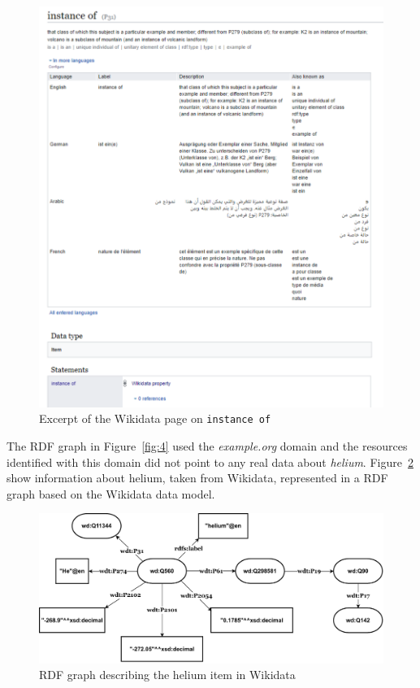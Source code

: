 \begin{figure}[hp]
  \centering
  \includegraphics[width=\linewidth]{images/instance_of.pdf}
  \caption{Excerpt of the Wikidata page on \texttt{instance of}}
  \label{fig:6}
\end{figure}


The RDF graph in Figure~\ref{fig:4} used the \textit{example.org} domain and the resources identified with this domain did not point to any real data about \textit{helium}. Figure~\ref{fig:7} show information about helium, taken from Wikidata, represented in a RDF graph based on the Wikidata data model. 


\begin{figure}[h]
  \centering
  \includegraphics[width=0.75 \linewidth]{images/wikidata_graph.drawio.pdf}
  \caption{RDF graph describing the helium item in Wikidata}
  \label{fig:7}
\end{figure}

